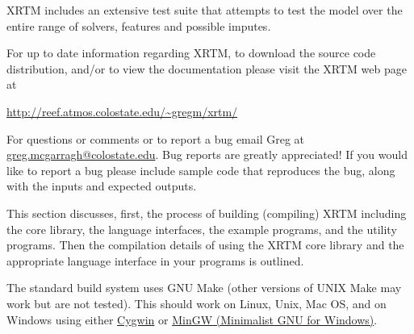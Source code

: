 XRTM includes an extensive test suite that attempts to test the model over the entire range of solvers, features and possible imputes.

For up to date information regarding XRTM, to download the source code distribution, and/or to view the documentation please visit the XRTM web page at
\begin{list}{}{}
\item \url{http://reef.atmos.colostate.edu/~gregm/xrtm/}
\end{list}

For questions or comments or to report a bug email Greg at \href{mailto:greg.mcgarragh@colostate.edu}{greg.mcgarragh@colostate.edu}.  Bug reports are greatly appreciated!  If you would like to report a bug please include sample code that reproduces the bug, along with the inputs and expected outputs.


%
\label{introduction_to_xrtm_license}



%
\label{introduction_to_xrtm_conventions_used_in_this_manual}

\conventions


%
\label{building_and_using_xrtm}

This section discusses, first, the process of building (compiling) XRTM including the core library, the language interfaces, the example programs, and the utility programs.  Then the compilation details of using the XRTM core library and the appropriate language interface in your programs is outlined.


\label{building_and_using_xrtm_building_xrtm}


\label{building_and_using_xrtm_building_xrtm_gnu_make}

The standard build system uses GNU Make (other versions of UNIX Make may work but are not tested).  This should work on Linux, Unix, Mac OS, and on Windows using either \href{http://www.cygwin.com/}{Cygwin} or \href{http://www.mingw.org/}{MinGW (Minimalist GNU for Windows)}.

